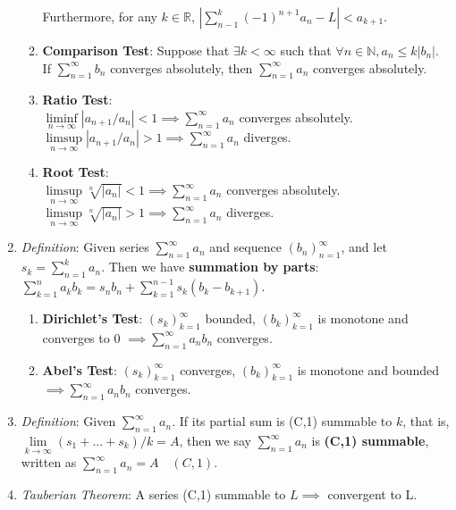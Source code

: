 \documentclass[10pt]{article}
\newcommand{\seqn}[1]{(#1)^\infty_{n=1}}
\newcommand{\seqk}[1]{(#1)^\infty_{k=1}}
\newcommand{\infsrsn}[1]{\sum\limits^\infty_{n=1}#1}
\newcommand{\real}{\mathbb{R}}
\newcommand{\nat}{\mathbb{N}}
\newcommand{\ntoinf}{\limits_{n\to\infty}}
\newcommand{\ktoinf}{\limits_{k\to\infty}}
\begin{document}
\begin{multicols*}{3}
\begin{enumerate}
\begin{enumerate}
					Furthermore, for any $k\in\real$,
					$|\sum_{n-1}^{k}(-1)^{n+1}a_n-L|<a_{k+1}$.
				\item \textbf{Comparison Test}: Suppose that $\exists k<\infty$ such
					that $\forall n\in\nat,a_{n}\leq k|b_{n}|$. If $\infsrsn{b_{n}}$
					converges absolutely, then $\infsrsn{a_{n}}$ converges absolutely.
				\item \textbf{Ratio Test}:\\
					$\liminf\ntoinf|a_{n+1}/a_{n}|<1\implies\infsrsn{a_{n}}$ converges
					absolutely.
				$\limsup\ntoinf|a_{n+1}/a_{n}|>1\implies\infsrsn{a_{n}}$ diverges.
				\item \textbf{Root Test}:\\
					$\limsup\ntoinf\sqrt[n]{|a_n|}<1\implies\infsrsn{a_{n}}$ converges
					absolutely.
					$\limsup\ntoinf\sqrt[n]{|a_n|}>1\implies\infsrsn{a_{n}}$ diverges.
			\end{enumerate}
		\item \emph{Definition}: Given series $\infsrsn{a_{n}}$ and sequence
			$\seqn{b_{n}}$, and let $s_{k}=\sum\limits_{n=1}^{k}a_{n}$. Then we have
			\textbf{summation by parts}: $\sum\limits_{k=1}^{n}a_{k}b_{k}=s_{n}b_{n}+\sum\limits_{k=1}^{n-1}s_{k}(b_{k}-b_{k+1})$.
			\begin{enumerate}
				\item \textbf{Dirichlet's Test}: $\seqk{s_{k}}$ bounded, $\seqk{b_{k}}$
					is monotone and converges to 0 $\implies\infsrsn{a_{n}b_{n}}$ converges.
				\item \textbf{Abel's Test}: $\seqk{s_{k}}$ converges, $\seqk{b_{k}}$
					is monotone and bounded $\implies\infsrsn{a_{n}b_{n}}$ converges.
			\end{enumerate}
		\item \emph{Definition}: Given $\infsrsn{a_{n}}$. If its partial sum is
			(C,1) summable to $k$, that is, $\lim\ktoinf(s_{1}+\dots+s_{k})/k=A$, then
			we say $\infsrsn{a_{n}}$ is \textbf{(C,1) summable}, written as
			$\infsrsn{a_{n}}=A\quad(C,1)$.
		\item \emph{Tauberian Theorem}: A series (C,1) summable to $L\implies$
			convergent to L.
	\end{enumerate}


\end{multicols*}
\end{document}
